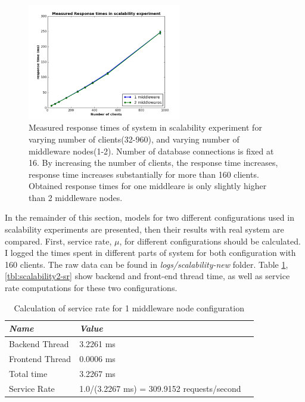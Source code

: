 \documentclass[11pt]{article}
\begin{document}
\begin{figure}[H]
  \includegraphics[width=0.6\textwidth,page=1]{figures/mm1/scalability-new/response-times}
  \centering
  \caption{Measured response times of system in scalability experiment for varying number of clients(32-960), and varying 
  number of middleware nodes(1-2). Number of database connections is fixed at 16. By increasing the number 
  of clients, the response time increases, response time increases substantially for more than 160 clients. Obtained 
  response times for one middleare is only slightly higher than 2 middleware nodes.}
  \label{fig:scalability-res}
\end{figure}


In the remainder of this section, models for two different configurations used in 
scalability experiments are presented, then their results with real system are compared.
First, service rate, $\mu$, for different configurations should be calculated.
I logged the times spent in different parts of system for both configuration with 160 clients. The raw data can be found in 
\emph{logs/scalability-new} folder. Table \ref{tbl:scalability1-sr}, \ref{tbl:scalability2-sr}
show backend and front-end thread time, as well as service rate computations for these two configurations. 

\begin{table}[!ht]
  \begin{tabular}{*3l}    \toprule
    \emph{Name}   & \emph{Value} \\
    \hline
      Backend Thread     & 3.2261 ms \\
      Frontend Thread    & 0.0006 ms \\
      Total time         & 3.2267 ms \\
    \hline
      Service Rate       & 1.0/(3.2267 ms) = 309.9152 requests/second \\
    \hline
  \end{tabular}
  \centering
  \caption{Calculation of service rate for 1 middleware node configuration}
  \label{tbl:scalability1-sr}
\end{table}
\end{document}
